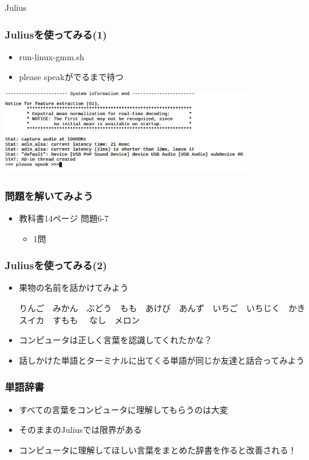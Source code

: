 \documentclass[14pt]{beamer}
\begin{document}
\begin{frame}
  \centering
  {\Large Julius}
\end{frame}

\begin{frame}
  \frametitle{Juliusを使ってみる(1)}
  \begin{itemize}
    \item run-linux-gmm.sh
    \item \<\<please speak\>\>がでるまで待つ
  \end{itemize}
  \centering
  \includegraphics[width=0.8\textwidth]{chap06/text06-img009.png}
\end{frame}

\begin{frame}
  \frametitle{問題を解いてみよう}
  \begin{itemize}
    \item 教科書14ページ 問題6-7
          \begin{itemize}
            \item 1問
          \end{itemize}
  \end{itemize}
\end{frame}

\begin{frame}
  \frametitle{Juliusを使ってみる(2)}
  \begin{itemize}
    \item 果物の名前を話かけてみよう
          \begin{center}
            {\small りんご　みかん　ぶどう　もも　あけび　あんず　いちご　いちじく　かき　スイカ　すもも　	なし　メロン}
          \end{center}
    \item コンピュータは正しく言葉を認識してくれたかな？
    \item 話しかけた単語とターミナルに出てくる単語が同じか友達と話合ってみよう
  \end{itemize}
\end{frame}

\begin{frame}
  \frametitle{単語辞書}
  \begin{itemize}
    \item すべての言葉をコンピュータに理解してもらうのは大変
    \item そのままのJuliusでは限界がある
    \item コンピュータに理解してほしい言葉をまとめた辞書を作ると改善される！
  \end{itemize}
\end{frame}
\end{document}
